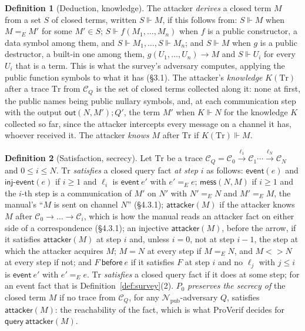 \documentclass[11pt]{article}
\theoremstyle{definition}
\newtheorem{definition}{Definition}[section]
\theoremstyle{plain}
\theoremstyle{remark}
\begin{document}
\begin{definition}[Deduction, knowledge]\label{def:knowledge}
The attacker \emph{derives} a closed term $M$ from a set $S$ of closed terms, written $S\Vdash M$, if this follows from: $S\Vdash M$ when $M=_E M'$ for some $M'\in S$; $S\Vdash f(M_1,\dots,M_n)$ when $f$ is a public constructor, a data symbol among them, and $S\Vdash M_1,\dots,S\Vdash M_n$; and $S\Vdash M$ when $g$ is a public destructor, a built-in one among them, $g(U_1,\dots,U_n)\to M$ and $S\Vdash U_i$ for every $U_i$ that is a term. This is what the survey's adversary computes, applying the public function symbols to what it has (\S3.1). The attacker's \emph{knowledge} $K(\mathrm{Tr})$ after a trace $\mathrm{Tr}$ from $\mathcal{C}_Q$ is the set of closed terms collected along it: none at first, the public names being public nullary symbols, and, at each communication step with the output $\mathsf{out}(N,M');Q'$, the term $M'$ when $K\Vdash N$ for the knowledge $K$ collected so far, since the attacker intercepts every message on a channel it has, whoever received it. The attacker \emph{knows} $M$ after $\mathrm{Tr}$ if $K(\mathrm{Tr})\Vdash M$.
\end{definition}

\begin{definition}[Satisfaction, secrecy]\label{def:satisfies}
Let $\mathrm{Tr}$ be a trace $\mathcal{C}_Q=\mathcal{C}_0\xrightarrow{\ell_1}\mathcal{C}_1\cdots\xrightarrow{\ell_N}\mathcal{C}_N$ and $0\le i\le N$. $\mathrm{Tr}$ \emph{satisfies} a closed query fact \emph{at step} $i$ as follows: $\mathsf{event}(e)$ and $\mathsf{inj\text{-}event}(e)$ if $i\ge1$ and $\ell_i$ is $\mathsf{event}\ e'$ with $e'=_E e$; $\mathsf{mess}(N,M)$ if $i\ge1$ and the $i$-th step is a communication of $M'$ on $N'$ with $N'=_E N$ and $M'=_E M$, the manual's ``$M$ is sent on channel $N$'' (\S4.3.1); $\mathsf{attacker}(M)$ if the attacker knows $M$ after $\mathcal{C}_0\to\dots\to\mathcal{C}_i$, which is how the manual reads an attacker fact on either side of a correspondence (\S4.3.1); an injective $\mathsf{attacker}(M)$, before the arrow, if it satisfies $\mathsf{attacker}(M)$ at step $i$ and, unless $i=0$, not at step $i-1$, the step at which the attacker acquires $M$; $M=N$ at every step if $M=_E N$, and $M\mathbin{<>}N$ at every step if not; and $F\ \mathsf{before}\ e$ if it satisfies $F$ at step $i$ and no $\ell_j$ with $j\le i$ is $\mathsf{event}\ e'$ with $e'=_E e$. $\mathrm{Tr}$ \emph{satisfies} a closed query fact if it does at some step; for an event fact that is Definition~\ref{def:survey}(2). $P_0$ \emph{preserves the secrecy of} the closed term $M$ if no trace from $\mathcal{C}_Q$, for any $\mathcal{N}_{\mathrm{pub}}$-adversary $Q$, satisfies $\mathsf{attacker}(M)$: the reachability of the fact, which is what ProVerif decides for $\mathsf{query}\ \mathsf{attacker}(M)$.
\end{definition}
\end{document}

